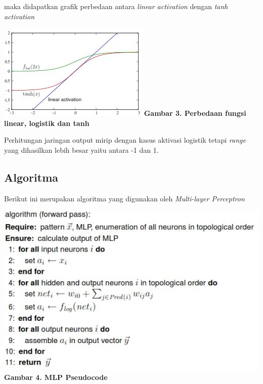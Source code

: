 	maka didapatkan grafik perbedaan antara \textit{linear activation} dengan \textit{tanh activation}
	\begin{center}
		\includegraphics{graphic-2.jpg}
		\newline \textbf{Gambar 3. Perbedaan fungsi linear, logistik dan tanh}
	\end{center}
	Perhitungan jaringan output mirip dengan kasus aktivasi logistik tetapi \textit{range} yang dihasilkan lebih besar yaitu antara -1 dan 1.

	\subsection{Algoritma}
	Berikut ini merupakan algoritma yang digunakan oleh \textit{Multi-layer Perceptron}
	\begin{center}
		\includegraphics{images-2.jpg}
		\newline \textbf{Gambar 4. MLP Pseudocode}
	\end{center}
